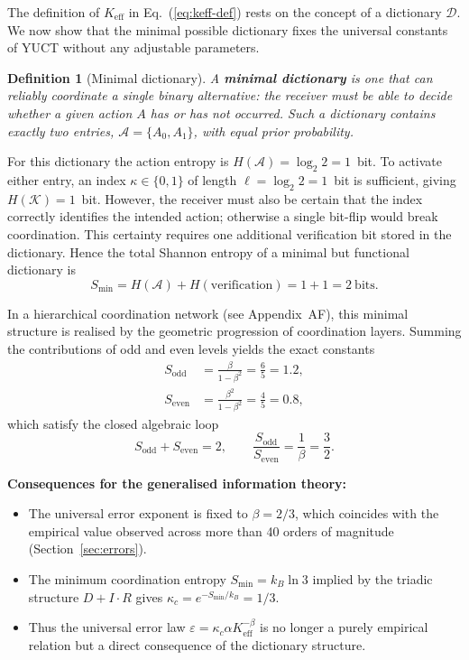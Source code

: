 \documentclass[12pt,a4paper]{article}
\newtheorem{definition}[theorem]{Definition}
\theoremstyle{remark}
\begin{document}
	The definition of \(K_{\mathrm{eff}}\) in Eq.~(\ref{eq:keff-def}) rests on the concept
	of a dictionary \(\mathcal{D}\).  We now show that the minimal possible dictionary
	fixes the universal constants of YUCT without any adjustable parameters.
	
	\begin{definition}[Minimal dictionary]
		A \textbf{minimal dictionary} is one that can reliably coordinate a single
		binary alternative: the receiver must be able to decide whether a given
		action \(A\) has or has not occurred.  Such a dictionary contains exactly two
		entries, \(\mathcal{A} = \{A_0, A_1\}\), with equal prior probability.
	\end{definition}
	
	For this dictionary the action entropy is \(H(\mathcal{A}) = \log_2 2 = 1\)~bit.
	To activate either entry, an index \(\kappa \in \{0,1\}\) of length
	\(\ell = \log_2 2 = 1\)~bit is sufficient, giving \(H(\mathcal{K}) = 1\)~bit.
	However, the receiver must also be certain that the index correctly identifies
	the intended action; otherwise a single bit-flip would break coordination.
	This certainty requires one additional verification bit stored in the dictionary.
	Hence the total Shannon entropy of a minimal but functional dictionary is
	\begin{equation}
		S_{\min} = H(\mathcal{A}) + H(\text{verification}) = 1 + 1 = 2\ \text{bits}.
		\label{eq:smin}
	\end{equation}
	
	In a hierarchical coordination network (see Appendix~AF), this minimal structure
	is realised by the geometric progression of coordination layers.  Summing the
	contributions of odd and even levels yields the exact constants
	\begin{align}
		S_{\mathrm{odd}} &= \frac{\beta}{1-\beta^{2}} = \frac{6}{5} = 1.2, \label{eq:sodd-appx}\\
		S_{\mathrm{even}} &= \frac{\beta^{2}}{1-\beta^{2}} = \frac{4}{5} = 0.8, \label{eq:seven-appx}
	\end{align}
	which satisfy the closed algebraic loop
	\begin{equation}
		S_{\mathrm{odd}} + S_{\mathrm{even}} = 2, \qquad
		\frac{S_{\mathrm{odd}}}{S_{\mathrm{even}}} = \frac{1}{\beta} = \frac{3}{2}.
		\label{eq:algebraic-loop-appx}
	\end{equation}
	
	\textbf{Consequences for the generalised information theory:}
	\begin{itemize}
		\item The universal error exponent is fixed to \(\beta = 2/3\), which coincides
		with the empirical value observed across more than 40 orders of magnitude
		(Section~\ref{sec:errors}).
		\item The minimum coordination entropy \(S_{\min} = k_B \ln 3\) implied by the
		triadic structure \(D+I\!\cdot\!R\) gives \(\kappa_c = e^{-S_{\min}/k_B} = 1/3\).
		\item Thus the universal error law \(\varepsilon = \kappa_c \alpha K_{\mathrm{eff}}^{-\beta}\)
		is no longer a purely empirical relation but a direct consequence of the
		dictionary structure.
	\end{itemize}
	
\end{document}
